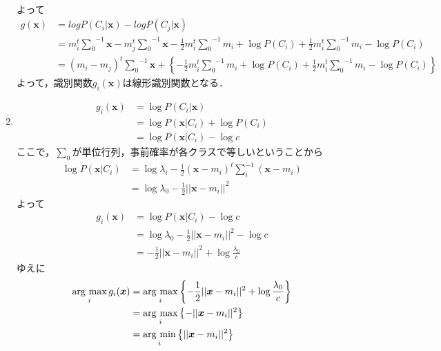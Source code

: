 \begin{enumerate}
\begin{align*}
    \end{align*}
    よって
    \begin{align*}
        g(\bm{x})&=log{P(C_i|\bm{x})}-log{P(C_j|\bm{x})}\\
        &=m_i^t{{\bm{\sum}}_0}^{-1}\bm{x}-m_j^t{{\bm{\sum}}_0}^{-1}\bm{x}-\frac{1}{2}m_i^t{{\bm{\sum}}_0}^{-1}m_i+\log{P(C_i)}+\frac{1}{2}m_i^t{{\bm{\sum}}_0}^{-1}m_i-\log{P(C_i)}\\
        &=(m_i-m_j)^t{{\bm{\sum}}_0}^{-1}\bm{x}+\left\{-\frac{1}{2}m_i^t{{\bm{\sum}}_0}^{-1}m_i+\log{P(C_i)}+\frac{1}{2}m_i^t{{\bm{\sum}}_0}^{-1}m_i-\log{P(C_i)}\right\}
    \end{align*}
    よって，識別関数$g_i(\bm{x})$は線形識別関数となる．
    \item
    \begin{align*}
        g_i(\bm{x})&=\log{P(C_i|\bm{x})}\\
        &=\log{P(\bm{x}|C_i)}+\log{P(C_i)}\\
        &=\log{P(\bm{x}|C_i)}-\log{c}
    \end{align*}
    ここで，$\sum_0$が単位行列，事前確率が各クラスで等しいということから
    \begin{align*}
        \log{P(\bm{x}|C_i)}&=\log\lambda_i-\frac{1}{2}(\bm{x}-m_i)^t{\bm{\sum}}_i^{-1}(\bm{x}-m_i)\\
        &=\log{\lambda_0}-\frac{1}{2}||\bm{x}-m_i||^2
    \end{align*}
    よって
    \begin{align*}
        g_i(\bm{x})&=\log{P(\bm{x}|C_i)}-\log{c}\\
        &=\log{\lambda_0}-\frac{1}{2}||\bm{x}-m_i||^2-\log{c}\\
        &=-\frac{1}{2}||\bm{x}-m_i||^2+\log{\frac{\lambda_0}{c}}
    \end{align*}
    ゆえに
    \begin{align*}
        \mathop{\rm arg~max}\limits_i{g_i(\bm{x})}&=\mathop{\rm arg~max}\limits_i\left\{-\frac{1}{2}||\bm{x}-m_i||^2+\log{\frac{\lambda_0}{c}}\right\}\\
        &=\mathop{\rm arg~max}\limits_i\left\{-||\bm{x}-m_i||^2\right\}\\
        &=\mathop{\rm arg~min}\limits_i\left\{||\bm{x}-m_i||^2\right\}
    \end{align*}
\end{enumerate}
